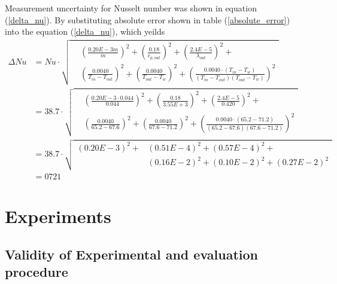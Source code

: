 \documentclass[12pt,oneside]{jbook}
\begin{document}
Measurement uncertainty for Nusselt number was shown in equation (\ref{delta_nu}).
By substituting absolute error shown in table (\ref{absolute_error}) into the equation (\ref{delta_nu}), which yeilds
\begin{align}
    \Delta Nu & = Nu\cdot
    \sqrt{
    \begin{aligned}
        & \left(\frac{0.20E-3\dot{m}}{\dot{m}}\right)^{2}
        + \left(\frac{0.18}{c_{p,out}}\right)^{2}
        + \left(\frac{2.4E-5}{\lambda_{out}}\right)^{2}+\\
        & \left(\frac{0.0040}{T_{in} - T_{out}}\right)^{2}
        + \left(\frac{0.0040}{T_{out} - T_{w}}\right)^{2}
        + \left(\frac{0.0040\cdot \left( T_{in} - T_{w}\right)}{\left( T_{in} - T_{out}\right)\left( T_{out}-T_{w} \right)} \right)^{2}
    \end{aligned}
          }\\
    & = 38.7\cdot
    \sqrt{
    \begin{aligned}
        & \left(\frac{0.20E-3\cdot 0.044}{0.044}\right)^{2}
        + \left(\frac{0.18}{3.55E+3}\right)^{2}
        + \left(\frac{2.4E-5}{0.420}\right)^{2}+\\
        & \left(\frac{0.0040}{65.2 - 67.6}\right)^{2}
        + \left(\frac{0.0040}{67.6 - 71.2}\right)^{2}
        + \left(\frac{0.0040\cdot \left(65.2 - 71.2\right)}{\left(65.2 - 67.6\right)\left(67.6 - 71.2\right)}\right)^{2}
    \end{aligned}
         }\\
    & = 38.7\cdot
    \sqrt{
    \begin{aligned}
        \left(0.20E-3\right)^{2} +
        & \left(0.51E-4\right)^{2}
        + \left(0.57E-4\right)^{2} +\\
        & \left(0.16E-2\right)^{2}
        + \left(0.10E-2\right)^{2}
        + \left(0.27E-2\right)^{2}
    \end{aligned}
         }\\
    & = 0721
\end{align}








\chapter{Experiments}
\section{Validity of Experimental and evaluation procedure}
\end{document}
